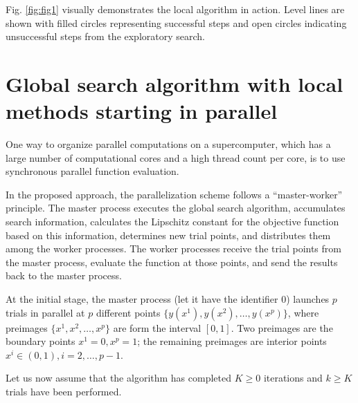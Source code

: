 \documentclass[runningheads]{llncs}
\begin{document}
Fig. \ref{fig:fig1} visually demonstrates the local algorithm in action. Level lines are shown with filled circles representing successful steps and open circles indicating unsuccessful steps from the exploratory search. 


\section{Global search algorithm with local methods starting in parallel}\label{SecGSA}



One way to organize parallel computations on a supercomputer, which has a large number of computational cores and a high thread count per core, is to use synchronous parallel function evaluation.

In the proposed approach, the parallelization scheme follows a ``master-worker'' principle. The master process executes the global search algorithm, accumulates search information, calculates the Lipschitz constant for the objective function based on this information, determines new trial points, and distributes them among the worker processes. The worker processes receive the trial points from the master process, evaluate the function at those points, and send the results back to the master process.



At the initial stage, the master process (let it have the identifier 0) launches $p$ trials in parallel at $p$ different points $\{y\left(x^1\right),y\left(x^2\right),\ldots,y\left(x^p\right)\}$, where preimages $\{x^1,x^2,\ldots,x^p\}$ are form the interval $[0,1]$.
Two preimages are the boundary points $x^1=0, x^p=1$; the remaining preimages are interior points $x^i\in\left(0,1\right),i=2,\ldots,p-1$.

Let us now assume that the algorithm has completed $K \geq 0$ iterations and $k \geq K$ trials have been performed.
\end{document}

